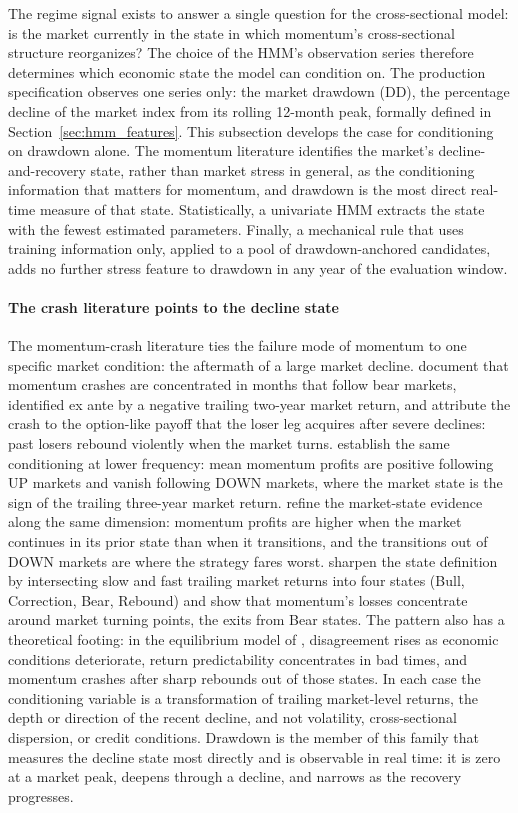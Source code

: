 The regime signal exists to answer a single question for the cross-sectional model: is the market currently in the state in which momentum's cross-sectional structure reorganizes? The choice of the HMM's observation series therefore determines which economic state the model can condition on. The production specification observes one series only: the market drawdown (DD), the percentage decline of the market index from its rolling 12-month peak, formally defined in Section~\ref{sec:hmm_features}. This subsection develops the case for conditioning on drawdown alone. The momentum literature identifies the market's decline-and-recovery state, rather than market stress in general, as the conditioning information that matters for momentum, and drawdown is the most direct real-time measure of that state. Statistically, a univariate HMM extracts the state with the fewest estimated parameters. Finally, a mechanical rule that uses training information only, applied to a pool of drawdown-anchored candidates, adds no further stress feature to drawdown in any year of the evaluation window.

\paragraph{The crash literature points to the decline state}
The momentum-crash literature ties the failure mode of momentum to one specific market condition: the aftermath of a large market decline. \citet{DanielMoskowitz2016} document that momentum crashes are concentrated in months that follow bear markets, identified ex ante by a negative trailing two-year market return, and attribute the crash to the option-like payoff that the loser leg acquires after severe declines: past losers rebound violently when the market turns. \citet{Cooper2004} establish the same conditioning at lower frequency: mean momentum profits are positive following UP markets and vanish following DOWN markets, where the market state is the sign of the trailing three-year market return. \citet{AsemTian2010} refine the market-state evidence along the same dimension: momentum profits are higher when the market continues in its prior state than when it transitions, and the transitions out of DOWN markets are where the strategy fares worst. \citet{GHM2023} sharpen the state definition by intersecting slow and fast trailing market returns into four states (Bull, Correction, Bear, Rebound) and show that momentum's losses concentrate around market turning points, the exits from Bear states. The pattern also has a theoretical footing: in the equilibrium model of \citet{CujeanHasler2017}, disagreement rises as economic conditions deteriorate, return predictability concentrates in bad times, and momentum crashes after sharp rebounds out of those states. In each case the conditioning variable is a transformation of trailing market-level returns, the depth or direction of the recent decline, and not volatility, cross-sectional dispersion, or credit conditions. Drawdown is the member of this family that measures the decline state most directly and is observable in real time: it is zero at a market peak, deepens through a decline, and narrows as the recovery progresses.

